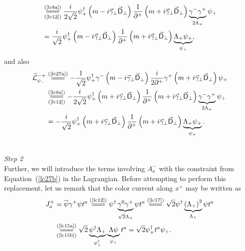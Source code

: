 \begin{note}
\begin{align*}
&\underset{(\text{\cref{lc12}})}{\stackrel{(\text{\cref{lc8a}})}{=\joinrel=\joinrel=}}\frac{i}{2\sqrt{2}}\psi_+^\dag\left(m-i\vec{\gamma}_\perp\vec{\textsf{D}}_\perp\right)\frac{1}{\partial^+}\left(m+i\vec{\gamma}_\perp\vec{\textsf{D}}_\perp\right)\underbrace{\gamma^-\gamma^+}_{2\Lambda_+}\psi_+\\
&=\frac{i}{\sqrt{2}}\psi_+^\dag\left(m-i\vec{\gamma}_\perp\vec{\textsf{D}}_\perp\right)\frac{1}{\partial^+}\left(m+i\vec{\gamma}_\perp\vec{\textsf{D}}_\perp\right)\underbrace{\Lambda_+\psi_+}_{\psi_+},
\end{align*}
and also
\begin{align*}
\widetilde{\mathcal{L}}_{\psi_-}^{-+}&\stackrel{(\text{\cref{lc27a}})}{=\joinrel=\joinrel=}-\frac{1}{\sqrt{2}}\psi_+^\dag\gamma^-\left(m-i\vec{\gamma}_\perp\vec{\textsf{D}}_\perp\right)\frac{i}{2\partial^+}\gamma^+\left(m+i\vec{\gamma}_\perp\vec{\textsf{D}}_\perp\right)\psi_+\\
&\underset{(\text{\cref{lc12}})}{\stackrel{(\text{\cref{lc8a}})}{=\joinrel=\joinrel=}}-\frac{i}{2\sqrt{2}}\psi_+^\dag\left(m+i\vec{\gamma}_\perp\vec{\textsf{D}}_\perp\right)\frac{1}{\partial^+}\left(m+i\vec{\gamma}_\perp\vec{\textsf{D}}_\perp\right)\underbrace{\gamma^-\gamma^+}_{2\Lambda_+}\psi_+\\
&=-\frac{i}{\sqrt{2}}\psi_+^\dag\left(m+i\vec{\gamma}_\perp\vec{\textsf{D}}_\perp\right)\frac{1}{\partial^+}\left(m+i\vec{\gamma}_\perp\vec{\textsf{D}}_\perp\right)\underbrace{\Lambda_+\psi_+}_{\psi_+}.
\end{align*}
\end{note}

\noindent \\
{\color{ming}\textit{\sffamily Step 2}}\\ 
\noindent
Further, we will introduce the terms involving $A_a^-$ with the constraint from Equation~(\cref{lc27b}) in the Lagrangian. Before attempting to perform this replacement, let us remark that the color current along $x^+$ may be written as
\begin{equation}\label{lc40}
    \begin{aligned}
    J_a^+&=\overline{\psi}\gamma^+\psi t^a\stackrel{(\text{\cref{lc12}})}{=\joinrel=\joinrel=}\psi^\dag\underbrace{\gamma^0\gamma^+}_{\sqrt{2}\Lambda_+}\psi t^a\stackrel{(\text{\cref{lc17}})}{=\joinrel=\joinrel=}\sqrt{2}\psi^\dag\underbrace{\left(\Lambda_+\right)^2}_{\Lambda_+}\psi t^a\\
    &\underset{(\text{\cref{lc15b}})}{\stackrel{(\text{\cref{lc15a}})}{=\joinrel=\joinrel=}}\sqrt{2}\underbrace{\psi^\dag\Lambda_+}_{\psi_+^\dag}\underbrace{\Lambda\psi}_{\psi_+}t^a=\sqrt{2}\psi_+^\dag t^a\psi_+.
    \end{aligned}
\end{equation}


